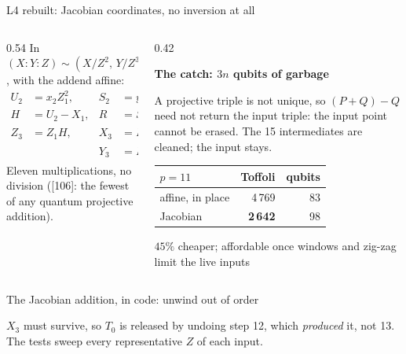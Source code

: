 \documentclass[aspectratio=169,11pt]{beamer}
\newcommand{\peachtitle}[1]{{\bfseries\color{cverm}#1}\par\vskip1mm}
\newcommand{\code}[2][]{}
\begin{document}
\setcounter{framenumber}{91}
\begin{frame}{L4 rebuilt: Jacobian coordinates, no inversion at all}
  \begin{columns}[T]
    \begin{column}{0.54\textwidth}
      In $(X\!:\!Y\!:\!Z)\sim(X/Z^2,\,Y/Z^3)$, with the addend affine:
      \vskip-1mm
      \[ \begin{aligned} U_2&=x_2Z_1^2, & S_2&=y_2Z_1^3,\\ H&=U_2-X_1, & R&=S_2-Y_1,\\ Z_3&=Z_1H, & X_3&=R^2-H^3-2X_1H^2,\\ && Y_3&=R(X_1H^2-X_3)-Y_1H^3 . \end{aligned} \]
      Eleven multiplications, no division ([106]: the fewest of any quantum projective addition).
    \end{column}
    \begin{column}{0.42\textwidth}
      \begin{peachblock}[fontupper=\small]\peachtitle{The catch: $3n$ qubits of garbage}
        A projective triple is not unique, so $(P+Q)-Q$ need not return the input triple: the input point cannot be erased. The 15 intermediates are cleaned; the input stays.
      \end{peachblock}
      \centering\footnotesize
      \renewcommand{\arraystretch}{1.08}
      \begin{tabular}{@{}lrr@{}}
        \toprule
        $p=11$ & Toffoli & qubits \\
        \midrule
        affine, in place & 4\,769 & 83 \\
        Jacobian & \textbf{2\,642} & 98 \\
        \bottomrule
      \end{tabular}\par
      {\scriptsize $45\%$ cheaper; affordable once windows and zig-zag limit the live inputs}
    \end{column}
  \end{columns}
\end{frame}

\setcounter{framenumber}{92}
\begin{frame}[fragile]{The Jacobian addition, in code: unwind out of order}
  \code[basicstyle=\ttfamily\fontsize{7.6}{8.8}\selectfont]{jacobian.py}
  {\small $X_3$ must survive, so $T_0$ is released by undoing step 12, which \emph{produced} it, not 13. The tests sweep every representative $Z$ of each input.}
\end{frame}
\end{document}
